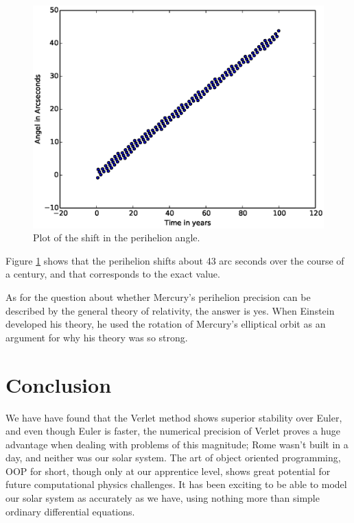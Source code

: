 \documentclass{article}
\begin{document}
\begin{figure}[H]
  \includegraphics[scale=0.7]{plots/Perihilion.eps}
  \caption{Plot of the shift in the perihelion angle.}
  \label{perihelion}
\end{figure}

Figure \ref{perihelion} shows that the perihelion shifts about 43 arc seconds over the course of a century, and that corresponds to the exact value. 

\vskip0.5cm
As for the question about whether Mercury's perihelion precision can be described by the general theory of relativity, the answer is yes. When Einstein developed his theory, he used the rotation of Mercury's elliptical orbit as an argument for why his theory was so strong. \cite{wiki_rel}



\section{Conclusion}

We have have found that the Verlet method shows superior stability over Euler, and even though Euler is faster, the numerical precision of Verlet proves a huge advantage when dealing with problems of this magnitude; Rome wasn't built in a day, and neither was our solar system. The art of object oriented programming, OOP for short, though only at our apprentice level, shows great potential for future computational physics challenges. It has been exciting to be able to model our solar system as accurately as we have, using nothing more than simple ordinary differential equations. 
\end{document}
